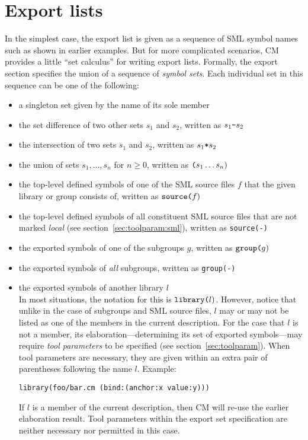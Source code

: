 %

\section{Export lists}
\label{sec:exportcalculus}

In the simplest case, the export list is given as a sequence of SML
symbol names such as shown in earlier examples.  But for more
complicated scenarios, CM provides a little ``set calculus'' for
writing export lists.  Formally, the export section specifies the
union of a sequence of {\em symbol sets}.  Each individual set in this
sequence can be one of the following:

\begin{itemize}\setlength{\itemsep}{0pt}
\item a singleton set given by the name of its sole member
\item the set difference of two other sets $s_1$ and $s_2$, written as $s_1
\mbox{\tt -} s_2$
\item the intersection of two sets $s_1$ and $s_2$, written as $s_1
\mbox{\tt *} s_2$
\item the union of sets $s_1, \ldots, s_n$ for $n \ge 0$, written as
$\mbox{\tt (} s_1 \ldots s_n \mbox{)}$
\item the top-level defined symbols of one of the SML source files $f$
that the given library or group consists of, written as
$\mbox{\tt source(}f\mbox{)}$
\item the top-level defined symbols of all constituent SML source
files that are not marked {\em local} (see section~\ref{sec:toolparam:sml}),
written as {\tt source(-)}
\item the exported symbols of one of the subgroups $g$, written as
$\mbox{\tt group(}g\mbox{)}$
\item the exported symbols of {\em all} subgroups, written as
{\tt group(-)}
\item the exported symbols of another library $l$ \\
In most situations, the notation for this is $\mbox{\tt library(}l\mbox{)}$.
However, notice that unlike in the case of subgroups and SML source
files, $l$ may or may not be listed as one of the members in the
current description.  For the case that $l$ is not a member, its
elaboration---determining its set of exported symbols---may require
{\em tool parameters} to be specified (see
section~\ref{sec:toolparam}).  When tool parameters are necessary,
they are given within an extra pair of parentheses following the name
$l$.  Example:
\begin{lstlisting}[language=CM]
  library(foo/bar.cm (bind:(anchor:x value:y)))
\end{lstlisting}%
\noindent If $l$ is a member of the current description, then CM will
re-use the earlier elaboration result.  Tool parameters within the
export set specification are neither necessary nor permitted in this case.
\end{itemize}


